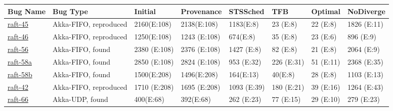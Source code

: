 \setlength{\textfloatsep}{2.0pt plus 2.0pt minus 4.0pt} %


\begin{table*}
{
\centering
\footnotesize
\begin{tabular}{|l|l|l|l|l|l||l||l|}
  \cline{1-8}
  \textbf{Bug Name} & \textbf{Bug Type} &
  \textbf{Initial} & \textbf{Provenance} &
  \textbf{STSSched} & \textbf{TFB} & \textbf{Optimal} & \textbf{NoDiverge} \\\cline{1-7} \hline
\href{https://docs.google.com/document/d/1alldH4lRSpFQ55-YCNFaIcMpjxrBOMNaB7R_9eEVwfs}{raft-45}
& Akka-FIFO, reproduced
& 2160\hfill (E:108) & 2138\hfill (E:108) & 1183\hfill (E:8) & 23 \hfill (E:8)
& 22 \hfill (E:8) & 1826 \hfill (E:11) \\

\href{https://docs.google.com/document/d/1vhGftMIlmm_uFLmCz2GI0CCPmttDUR617hJ72k2BTbY}{raft-46}
& Akka-FIFO, reproduced
& 1250\hfill (E:108) & 1243 \hfill (E:108) & 674\hfill (E:8) & 35 \hfill (E:8)
& 23 \hfill (E:6) & 896 \hfill (E:9) \\

\href{https://docs.google.com/document/d/1_UPKhjYoSrG9p4FQXqML_WQKa3WNbM2fch2aa0V-9Go}{raft-56}
& Akka-FIFO, found
& 2380 \hfill (E:108) & 2376 \hfill (E:108) & 1427 \hfill (E:8) & 82 \hfill
(E:8) & 21 \hfill (E:8) & 2064 \hfill (E:9) \\

\href{https://docs.google.com/document/d/1_efq5rbOGCG3sG-2qxbbOeIRztW9XYP6xgyh0QFmWXg}{raft-58a}
& Akka-FIFO, found
& 2850 \hfill (E:108) & 2824 \hfill (E:108) & 953 \hfill (E:32) & 226 \hfill
(E:31) & 51 \hfill (E:11) & 2368 \hfill (E:35) \\

\href{https://docs.google.com/document/d/1eERBdohTC3UidHJ6cZq12ixpp_eiVqzT7LvzuTeEtR4}{raft-58b}
& Akka-FIFO, found
& 1500\hfill (E:208) & 1496\hfill (E:208) & 164\hfill (E:13) & 40\hfill (E:8)
& 28 \hfill (E:8) & 1103 \hfill (E:13) \\

\href{https://docs.google.com/document/d/1BN4hpTKtN_-inqyT5XTGogI8QSlohnP2Y7A01nuW7TI}{raft-42}
& Akka-FIFO, reproduced
& 1710 \hfill (E:208) & 1695 \hfill (E:208) & 1093 \hfill (E:39) & 180 \hfill
(E:21) & 39 \hfill (E:16) & 1264 \hfill (E:43) \\

\href{https://docs.google.com/document/d/1lCAR_IE_U27CA-VTlPCi4Kyxf4h6Ykx-0zbkHe0Gfbg}{raft-66}
& Akka-UDP, found
& 400\hfill (E:68) & 392\hfill (E:68) & 262 \hfill (E:23) & 77 \hfill (E:15) &
29 \hfill (E:10) & 279 \hfill (E:23) \\


\end{tabular}}
\end{table*}
